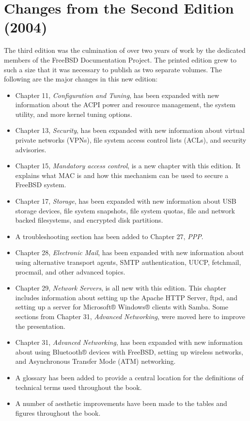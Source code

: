 \section{Changes from the Second Edition (2004)}

The third edition was the culmination of over two years of work by the dedicated
members of the FreeBSD Documentation Project.
The printed edition grew to such a size that it was necessary to publish as two
separate volumes.
The following are the major changes in this new edition:
\begin{itemize}
\item
   Chapter 11, \emph{Configuration and Tuning}, has been expanded with new
   information about the ACPI power and resource management, the 
   system utility, and more kernel tuning options.
\item
   Chapter 13, \emph{Security}, has been expanded with new information about
   virtual private networks (VPNs), file system access control lists (ACLs), and
   security advisories.
\item
   Chapter 15, \emph{Mandatory access control}, is a new chapter with this
   edition.
   It explains what MAC is and how this mechanism can be used to secure a
   FreeBSD system.
\item
   Chapter 17, \emph{Storage}, has been expanded with new information about USB
   storage devices, file system snapshots, file system quotas, file and network
   backed filesystems, and encrypted disk partitions.
\item
   A troubleshooting section has been added to Chapter 27, \emph{PPP}.
\item
   Chapter 28, \emph{Electronic Mail}, has been expanded with new information
   about using alternative transport agents, SMTP authentication, UUCP,
   fetchmail, procmail, and other advanced topics.
\item
   Chapter 29, \emph{Network Servers}, is all new with this edition.
   This chapter includes information about setting up the Apache HTTP Server,
   ftpd, and setting up a server for Microsoft® Windows® clients with Samba.
   Some sections from Chapter 31, \emph{Advanced Networking}, were moved here to
   improve the presentation.
\item
   Chapter 31, \emph{Advanced Networking}, has been expanded with new
   information about using Bluetooth® devices with FreeBSD, setting up wireless
   networks, and Asynchronous Transfer Mode (ATM) networking.
\item
   A glossary has been added to provide a central location for the definitions
   of technical terms used throughout the book.
\item
   A number of aesthetic improvements have been made to the tables and figures
   throughout the book.
\end{itemize}




